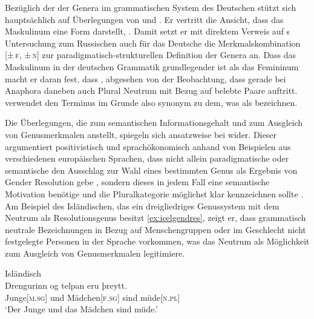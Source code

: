 Bezüglich der  der Genera im grammatischen System des
Deutschen stützt sich \citet{askedal1973} hauptsächlich auf Überlegungen von
\citet{jakobson1932} und \citet{bierwisch1967}. Er vertritt die Ansicht, dass
das Maskulinum eine  Form darstellt,
. Damit setzt er mit
direktem Verweis auf \citeauthor{jakobson1932}s Untersuchung zum Russischen
auch für das Deutsche die Merkmalskombination [\textsc{±\,f, ±\,n}] zur
paradigmatisch-strukturellen Definition der Genera an. Dass das Maskulinum in
der deutschen Grammatik grundlegender ist als das Femininum macht er daran
fest, dass , abgesehen von der Beobachtung,
dass gerade bei Anaphora daneben auch Plural Neutrum mit Bezug auf belebte
Paare auftritt. \citet{askedal1973} verwendet den Terminus  im
Grunde also synonym zu dem, was \textcites[205--218]{corbett1991}{wechsler2009}
als  bezeichnen.

Die Überlegungen, die \citeauthor{askedal1973} zum semantischen
Informationsgehalt und zum Ausgleich von Genusmerkmalen anstellt, spiegeln sich
ansatzweise bei \citet{corbett1991} wider. Dieser argumentiert positivistisch
und sprachökonomisch anhand von Beispielen aus verschiedenen europäischen
Sprachen, dass nicht allein paradigmatische oder semantische
 den Ausschlag zur Wahl eines bestimmten Genus als Ergebnis
von Gender Resolution gebe \autocite[290--293]{corbett1991}, sondern dieses
 in jedem Fall eine semantische Motivation benötige und
die Plural\-kategorie möglichst klar kennzeichnen sollte
\autocite[293--299]{corbett1991}. Am Beispiel des Isländischen, das ein
dreigliedriges Genussystem mit dem Neutrum als Resolutionsgenus besitzt
\cref{ex:icelgendres}, zeigt er, dass grammatisch neutrale Bezeichnungen in
Bezug auf Menschen\-gruppen oder im Geschlecht nicht festgelegte Personen in
der Sprache vorkommen, was das Neutrum als Möglichkeit zum Ausgleich von
Genusmerkmalen legiti\-miere.

\begin{exe}
\ex \label{ex:icelgendres}
	\langinfo%
		{Isländisch}%
		{\cites[nach][283]{corbett1991}[569]{wechsler2009}}\\
	\gll Drengurinn og telpan eru þreytt. \\
		Junge[\textsc{m.sg}] und Mädchen[\textsc{f.sg}] sind
		müde[\textsc{n.pl}] \\
	\trans `Der Junge und das Mädchen sind müde.'
\end{exe}

